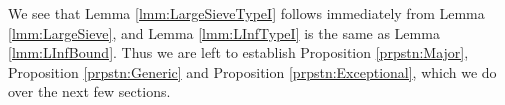 \documentclass[10pt]{amsart}
\theoremstyle{plain}
\numberwithin{sblmm}{thrm}
\numberwithin{equation}{section}
\begin{document}
%
%
%
%
We see that Lemma \ref{lmm:LargeSieveTypeI} follows immediately from Lemma \ref{lmm:LargeSieve}, and Lemma \ref{lmm:LInfTypeI} is the same as Lemma \ref{lmm:LInfBound}. Thus we are left to establish  Proposition \ref{prpstn:Major}, Proposition \ref{prpstn:Generic} and Proposition \ref{prpstn:Exceptional}, which we do over the next few sections.

%
%
%
%
%
%
%
\end{document}
